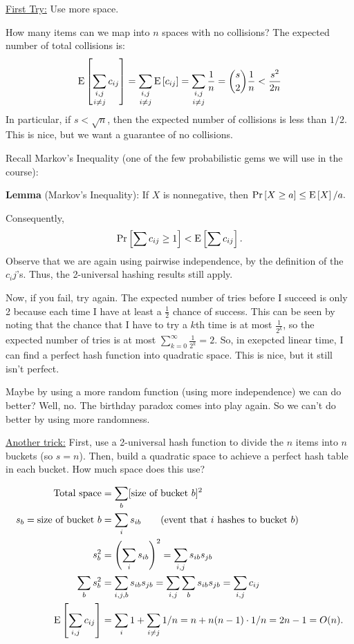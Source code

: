 \documentclass{article}
\renewcommand{\Pr}[1]{\textnormal{Pr}\left[ #1 \right]}
\newcommand{\E}[1]{\textnormal{E}\left[ #1 \right]}
\begin{document}
\underline{First Try:} Use more space.

How many items can we map into $n$ spaces with no collisions?  The expected number of total collisions is:
$$\E{\mathop{\sum_{i,j}}_{i\not=j} c_{ij}} = \mathop{\sum_{i,j}}_{i\not=j}\E{c_{ij}} = \mathop{\sum_{i,j}}_{i\not=j} {1 \over n} = {s \choose 2}{1 \over n} < {s^2 \over 2n}$$
In particular, if $s < \sqrt{n}$, then the expected number of collisions is less than $1/2$. This is nice, but we want a guarantee of no collisions.

Recall Markov's Inequality (one of the few probabilistic gems we will use in the course):

\textbf{Lemma} (Markov's Inequality):
If $X$ is nonnegative, then
$\Pr{X \geq a} \leq \E{X}/a.$

Consequently, $$\Pr{\sum c_{ij} \geq 1} < \E{\sum c_{ij}}.$$
Observe that we are again using pairwise independence, by the definition of the $c_ij$'s.  Thus, the 2-universal hashing results still apply.

Now, if you fail, try again.  The expected number of tries before I succeed is
only 2 because each time I have at least a $\frac{1}{2}$ chance of success. This can
be seen by noting that the chance that I have to try a $k$th time is at most $\frac{1}{2^k}$,
so the expected number of tries is at most $\sum_{k=0}^{\infty}\frac{1}{2^k} = 2$.
So, in exepcted linear time, I can find a perfect hash function into
quadratic space.  This is nice, but it still isn't perfect.

Maybe by using a more random function (using more independence) we can do better?  Well, no.  The birthday paradox comes into play again.  So we can't do better by using more randomness.

\underline{Another trick:}  First, use a 2-universal hash function to divide the $n$ items into $n$ buckets (so $s = n$).  Then, build a quadratic space to achieve a perfect hash table in each bucket.  How much space does this use?

\begin{align*}
\hbox{Total space} & = \sum_b [\hbox{size of bucket } b] ^2 \\
s_b = \hbox{size of bucket } b & = \sum_i s_{ib} \qquad\hbox{(event that $i$ hashes to bucket $b$)} \\
s_b^2 & = \left( \sum_i s_{ib}\right)^2= \sum_{i,j} s_{ib}s_{jb} \\
\sum_b s_b^2 & = \sum_{i,j,b} s_{ib}s_{jb} = \sum_{i,j}\sum_b s_{ib}s_{jb} = \sum_{i,j} c_{ij} \\
\E{\sum_{i,j}c_{ij}} & = \sum_{i}1 + \sum_{i\neq j}1/n = n + n(n-1)\cdot 1/n = 2n - 1 = O(n).
\end{align*}
\end{document}
